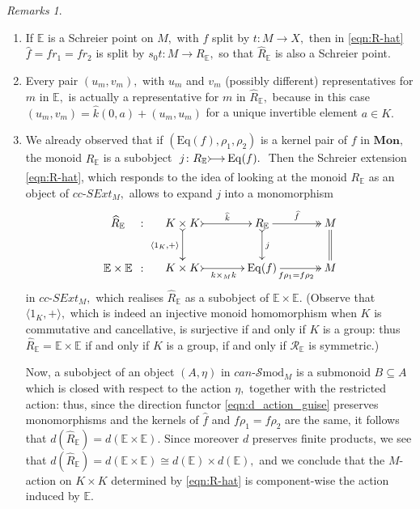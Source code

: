 \documentclass[a4paper]{amsart}
\theoremstyle{plain}
\theoremstyle{definition}
\theoremstyle{remark}
\newtheorem{remarks}[subsection]{Remarks}
\newcommand{\rel}[1]{\mathcal{R}_{\mathbb{#1}}} %
\newcommand{\la}{\langle}
\newcommand{\ra}{\rangle}
\begin{document}
\begin{remarks}
\label{rmks:R-hat}
\begin{enumerate}
\item If $\mathbb{E}$ is a Schreier point on $M,$ with $f$ split by $t\colon M\longrightarrow X,$ then in \eqref{eqn:R-hat} $\widehat{f}=fr_1=fr_2$ is split by $s_0t\colon M\longrightarrow R_{\mathbb{E}},$ so that $\widehat{R}_{\mathbb{E}}$ is also a Schreier point.
\item Every pair $(u_m,v_m),$ with $u_m$ and $v_m$ (possibly different) representatives for $m$ in $\mathbb{E},$ is actually a representative for $m$ in $\widehat{R}_{\mathbb{E}},$ because in this case $(u_m,v_m)=\widehat{k}(0,a)+(u_m,u_m)$ for a unique invertible element $a\in K.$
\item We already observed that if $(\mathrm{Eq}(f),\rho_1,\rho_2)$ is a kernel pair of $f$ in $\mathbf{Mon},$ the monoid $R_{\mathbb{E}}$ is a subobject $\xymatrixcolsep{1pc}\xymatrix{{j\colon R_{\mathbb{E}}} \ar@{>->}[r] &{\mathrm{Eq}(f).}}$ Then the Schreier extension \eqref{eqn:R-hat}, which responds to the idea of looking at the monoid $R_{\mathbb{E}}$ as an object of $cc\text{-}SExt_M,$ allows to expand $j$ into a monomorphism
\begin{equation*}
\begin{aligned}
{
\xymatrixcolsep{0.1pc}
\xymatrix{
{\widehat{R}_{\mathbb{E}}} &{:}\\
{\mathbb{E}\times\mathbb{E}} &{:}
}
}
{
\xymatrixcolsep{3pc}
\xymatrix{
{K\times K} \ar@{>->}[r]^-{\widehat{k}} \ar@{>->}[d]_-{\la1_K,+\ra} &{R_{\mathbb{E}}} \ar@{>->}[d]^-j \ar@{->>}[r]^-{\widehat{f}} &M \ar@{=}[d] \\
{K\times K} \ar@{>->}[r]_-{k\times_Mk} &{\mathrm{Eq}(f)} \ar@{->>}[r]_{f\rho_1=f\rho_2} &{M}
}
}
\end{aligned}
\end{equation*}
in $cc\text{-}SExt_M,$ which realises $\widehat{R}_{\mathbb{E}}$ as a subobject of $\mathbb{E}\times\mathbb{E}.$ (Observe that $\la1_K,+\ra,$ which is indeed an injective monoid homomorphism when $K$ is commutative and cancellative, is surjective if and only if $K$ is a group: thus $\widehat{R}_{\mathbb{E}}=\mathbb{E}\times\mathbb{E}$ if and only if $K$ is a group, if and only if $\rel{E}$ is symmetric.)

Now, a subobject of an object $(A,\eta)$ in $can\text{-}\mathcal{S}\mathrm{mod}_M$ is a submonoid $B\subseteq A$ which is closed with respect to the action $\eta,$ together with the restricted action: thus, since the direction functor \eqref{eqn:d_action_guise} preserves monomorphisms and the kernels of $\widehat{f}$ and $f\rho_1=f\rho_2$ are the same, it follows that $d(\widehat{R}_{\mathbb{E}})=d(\mathbb{E}\times\mathbb{E}).$ Since moreover $d$ preserves finite products, we see that $d(\widehat{R}_{\mathbb{E}})=d(\mathbb{E}\times\mathbb{E})\cong d(\mathbb{E})\times d(\mathbb{E}),$ and we conclude that the $M$-action on $K\times K$ determined by \eqref{eqn:R-hat} is component-wise the action induced by $\mathbb{E}.$
\end{enumerate}
\end{remarks}
\end{document}
